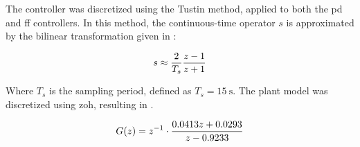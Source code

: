 The controller was discretized using the Tustin method, applied to both the
\gls{pd} and \gls{ff} controllers. In this method, the continuous-time operator
$s$ is approximated by the bilinear transformation given in :

\begin{equation}
\eqlabel{tustin}
s \approx \frac{2}{T_s}\frac{z-1}{z+1}
\end{equation}

Where $T_s$ is the sampling period, defined as $T_s = \SI{15}{\second}$. The
plant model was discretized using \gls{zoh}, resulting in .

\begin{equation}
\eqlabel{planta-gz-zoh}
G(z) = z^{-1} \cdot \frac{0.0413z + 0.0293}{z - 0.9233}
\end{equation}
